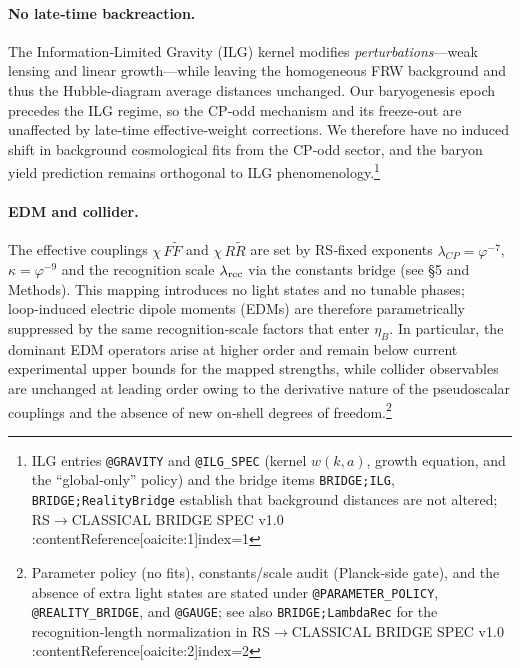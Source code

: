 \documentclass[11pt]{article}
\begin{document}
\paragraph{No late‑time backreaction.}
The Information‑Limited Gravity (ILG) kernel modifies \emph{perturbations}—weak lensing and linear growth—while leaving the homogeneous FRW background and thus the Hubble‑diagram average distances unchanged. Our baryogenesis epoch precedes the ILG regime, so the CP‑odd mechanism and its freeze‑out are unaffected by late‑time effective‑weight corrections. We therefore have no induced shift in background cosmological fits from the CP‑odd sector, and the baryon yield prediction remains orthogonal to ILG phenomenology.\footnote{ILG entries \texttt{@GRAVITY} and \texttt{@ILG\_SPEC} (kernel \(w(k,a)\), growth equation, and the “global‑only” policy) and the bridge items \texttt{BRIDGE;ILG}, \texttt{BRIDGE;RealityBridge} establish that background distances are not altered; RS\(\to\)CLASSICAL BRIDGE SPEC v1.0 :contentReference[oaicite:1]{index=1}}

\paragraph{EDM and collider.}
The effective couplings \(\chi\,F\tilde F\) and \(\chi\,R\tilde R\) are set by RS‑fixed exponents \(\lambda_{CP}=\varphi^{-7}\), \(\kappa=\varphi^{-9}\) and the recognition scale \(\lambda_{\rm rec}\) via the constants bridge (see §5 and Methods). This mapping introduces no light states and no tunable phases; loop‑induced electric dipole moments (EDMs) are therefore parametrically suppressed by the same recognition‑scale factors that enter \(\eta_B\). In particular, the dominant EDM operators arise at higher order and remain below current experimental upper bounds for the mapped strengths, while collider observables are unchanged at leading order owing to the derivative nature of the pseudoscalar couplings and the absence of new on‑shell degrees of freedom.\footnote{Parameter policy (no fits), constants/scale audit (Planck‑side gate), and the absence of extra light states are stated under \texttt{@PARAMETER\_POLICY}, \texttt{@REALITY\_BRIDGE}, and \texttt{@GAUGE}; see also \texttt{BRIDGE;LambdaRec} for the recognition‑length normalization in RS\(\to\)CLASSICAL BRIDGE SPEC v1.0 :contentReference[oaicite:2]{index=2}}
\end{document}

